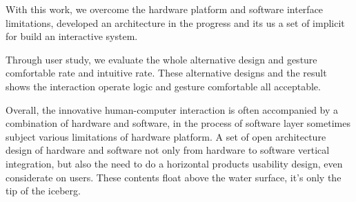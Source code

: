 With this work, we overcome the hardware platform and software interface limitations, developed an architecture in the progress and its us a set of implicit for build an interactive system.


Through user study, we evaluate the whole alternative design and gesture comfortable rate and intuitive rate. These alternative designs and the result shows the interaction operate logic and gesture comfortable all acceptable.


Overall, the innovative human-computer interaction is often accompanied by a combination of hardware and software, in the process of software layer sometimes subject various limitations of hardware platform. A set of open architecture design of hardware and software not only from hardware to software vertical integration, but also the need to do a horizontal products  usability design, even considerate on users. These contents float above the water surface, it's only the tip of the iceberg.

\cleardoublepage
